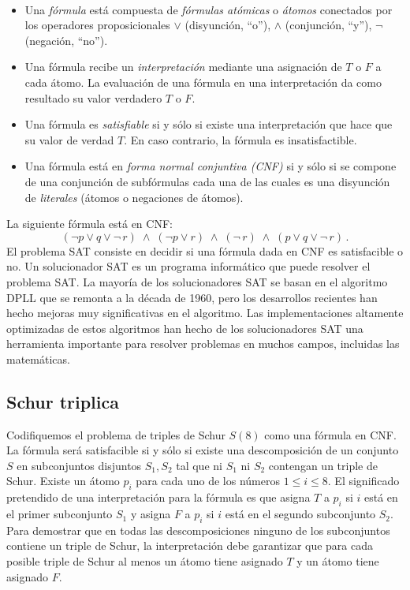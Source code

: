 \begin{definition}\label{def.sat}\mbox{}\\
\begin{itemize}
\item Una \emph{fórmula} está compuesta de \emph{fórmulas atómicas} o \emph{átomos} conectados por los operadores proposicionales $\vee$ (disyunción, ``o''), $\wedge$ (conjunción, ``y''), $\neg$ (negación, ``no'').
\item Una fórmula recibe un \emph{interpretación} mediante una asignación de $T$ o $F$ a cada átomo. La evaluación de una fórmula en una interpretación da como resultado su valor verdadero $T$ o $F$. 
\item Una fórmula es \emph{satisfiable} si y sólo si existe una interpretación que hace que su valor de verdad $T$. En caso contrario, la fórmula es insatisfactible.
\item Una fórmula está en \emph{forma normal conjuntiva (CNF)} si y sólo si se compone de una conjunción de subfórmulas cada una de las cuales es una disyunción de \emph{literales} (átomos o negaciones de átomos).
\end{itemize}
\end{definition}

La siguiente fórmula está en CNF:
\[
(\neg p \vee q \vee \neg \,r) \;\wedge\; (\neg p \vee r)
\;\wedge\; (\neg \,r)\;\wedge\;(p \vee q \vee \neg \,r)\,.
\]
El problema SAT consiste en decidir si una fórmula dada en CNF es satisfacible o no. Un solucionador SAT es un programa informático que puede resolver el problema SAT. La mayoría de los solucionadores SAT se basan en el algoritmo DPLL que se remonta a la década de 1960, pero los desarrollos recientes han hecho mejoras muy significativas en el algoritmo. Las implementaciones altamente optimizadas de estos algoritmos han hecho de los solucionadores SAT una herramienta importante para resolver problemas en muchos campos, incluidas las matemáticas.

\subsection{Schur triplica}

Codifiquemos el problema de triples de Schur $S(8)$ como una fórmula en CNF. La fórmula será satisfacible si y sólo si existe una descomposición de un conjunto $S$ en subconjuntos disjuntos $S_1,S_2$ tal que ni $S_1$ ni $S_2$ contengan un triple de Schur. Existe un átomo $p_i$ para cada uno de los números $1\leq i \leq 8$. El significado pretendido de una interpretación para la fórmula es que asigna $T$ a $p_i$ si $i$ está en el primer subconjunto $S_1$ y asigna $F$ a $p_i$ si $i$ está en el segundo subconjunto $S_2$. Para demostrar que en todas las descomposiciones ninguno de los subconjuntos contiene un triple de Schur, la interpretación debe garantizar que para cada posible triple de Schur al menos un átomo tiene asignado $T$ y un átomo tiene asignado $F$. 


